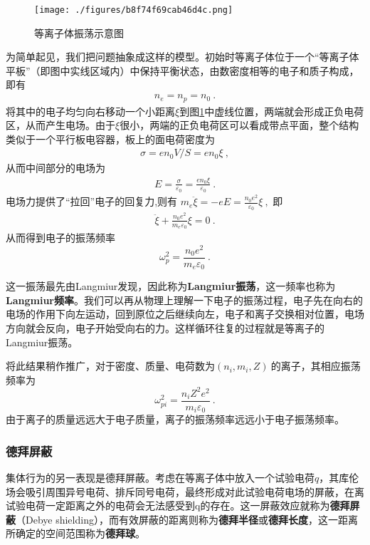 \begin{figure}[ht]
\centering
\texttt{[image: ./figures/b8f74f69cab46d4c.png]}
\caption{等离子体振荡示意图} \label{fig_Plasma_1}
\end{figure}

为简单起见，我们把问题抽象成这样的模型。初始时等离子体位于一个“等离子体平板”（即图中实线区域内）中保持平衡状态，由数密度相等的电子和质子构成，即有
			\begin{align}
				n_e=n_p=n_0~.
			\end{align}
			将其中的电子均匀向右移动一个小距离$\xi$到图\ref{fig_Plasma_1}中虚线位置，两端就会形成正负电荷区，从而产生电场。由于$\xi$很小，两端的正负电荷区可以看成带点平面，整个结构类似于一个平行板电容器，板上的面电荷密度为
			\begin{align}
			\sigma=en_0V/S=en_0\xi~,
			\end{align}
			从而中间部分的电场为
			\begin{align}
			E=\frac{\sigma}{\varepsilon_0}=\frac{en_0\xi}{\varepsilon_0}~.
			\end{align}
			电场力提供了“拉回”电子的回复力,则有
			$m_e\ddot{\xi}=-eE=\frac{n_0e^2}{\varepsilon_0}\xi~,$
			即
			\begin{align}
			\ddot{\xi}+\frac{n_0e^2}{m_e\varepsilon_0}\xi=0~.
			\end{align}
			从而得到电子的振荡频率
			\begin{equation}
			\boxed{\omega_p^2=\frac{n_0e^2}{m_e\varepsilon_0}}~.
			\end{equation}
			
			这一振荡最先由Langmiur发现，因此称为\textbf{Langmiur振荡}，这一频率也称为\textbf{Langmiur频率}。我们可以再从物理上理解一下电子的振荡过程，电子先在向右的电场的作用下向左运动，回到原位之后继续向左，电子和离子交换相对位置，电场方向就会反向，电子开始受向右的力。这样循环往复的过程就是等离子的Langmiur振荡。
			
			将此结果稍作推广，对于密度、质量、电荷数为$(n_i,m_i,Z)~$的离子，其相应振荡频率为
			\begin{equation}
			\omega_{pi}^2=\frac{n_i Z^2e^2}{m_i\varepsilon_0}~.
			\end{equation}
			由于离子的质量远远大于电子质量，离子的振荡频率远远小于电子振荡频率。


			\subsubsection{德拜屏蔽}
			
      集体行为的另一表现是德拜屏蔽。考虑在等离子体中放入一个试验电荷$q$，其库伦场会吸引周围异号电荷、排斥同号电荷，最终形成对此试验电荷电场的屏蔽，在离试验电荷一定距离之外的电荷会无法感受到q的存在。这一屏蔽效应就称为\textbf{德拜屏蔽}（Debye shielding），而有效屏蔽的距离则称为\textbf{德拜半径}或\textbf{德拜长度}，这一距离所确定的空间范围称为\textbf{德拜球}。
			
